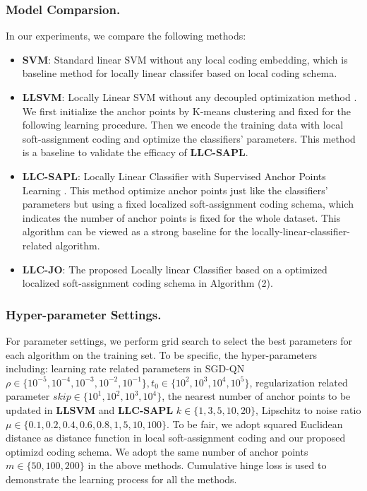 \documentclass{llncs}
\begin{document}
	\subsubsection{Model Comparsion.}
	In our experiments, we compare the following methods:
	\begin{itemize}
		\item \textbf{SVM}: Standard linear SVM without any local coding embedding, which is baseline method for locally linear classifer based on local coding schema.
		\item \textbf{LLSVM}: Locally Linear SVM without any decoupled optimization method \cite{2}. We first initialize the anchor points by K-means clustering and fixed for the following learning procedure. Then we encode the training data with local soft-assignment coding and optimize the classifiers' parameters. This method is a baseline to validate the efficacy of \textbf{LLC-SAPL}.
		\item \textbf{LLC-SAPL}: Locally Linear Classifier with Supervised Anchor Points Learning \cite{4}. This method optimize anchor points just like the classifiers' parameters but using a fixed localized soft-assignment coding schema, which indicates the number of anchor points is fixed for the whole dataset. This algorithm can be viewed as a strong baseline for the locally-linear-classifier-related algorithm.
		\item \textbf{LLC-JO}: The proposed Locally linear Classifier based on a optimized localized soft-assignment coding schema in Algorithm (2).
	\end{itemize}
	\subsubsection{Hyper-parameter Settings.}
	For parameter settings, we perform grid search to select the best parameters for each algorithm on the training set. To be specific, the hyper-parameters including: learning rate related parameters in SGD-QN $\rho \in \{10^{-5},10^{-4}, 10^{-3}, 10^{-2},10^{-1}\}, t_0 \in \{10^2,10^3,10^4,10^5\}$, regularization related parameter $skip \in \{10^1,10^2,10^3,10^4\}$, the nearest number of anchor points to be updated in \textbf{LLSVM} and \textbf{LLC-SAPL} $k \in \{1,3,5,10,20\}$, Lipschitz to noise ratio $\mu \in \{0.1,0.2,0.4,0.6,0.8,1,5,10,100\}$. To be fair, we adopt squared Euclidean distance as distance function in local soft-assignment coding and our proposed optimizd coding schema. We adopt the same number of anchor points $m \in \{50,100,200\}$ in the above methods. Cumulative hinge loss is used to demonstrate the learning process for all the methods.
\end{document}
